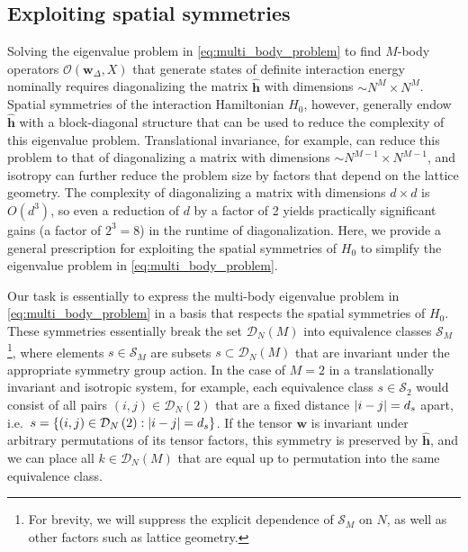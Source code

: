 \documentclass[nofootinbib,notitlepage,11pt]{revtex4-2}
\newcommand{\p}[1]{\left(#1\right)} %
\renewcommand{\set}[1]{\left\{#1\right\}} %
\newcommand{\m}{\bm} %
\newcommand{\1}{\mathds{1}}
\newcommand{\D}{\mathcal{D}}
\renewcommand{\O}{\mathcal{O}}
\renewcommand{\S}{\mathcal{S}}
\begin{document}
\subsection{Exploiting spatial symmetries}
\label{sec:symmetries}

Solving the eigenvalue problem in \eqref{eq:multi_body_problem} to find $M$-body operators $\O\p{\m w_\Delta,X}$ that generate states of definite interaction energy nominally requires diagonalizing the matrix $\hat{\m h}$ with dimensions $\sim N^M\times N^M$.
Spatial symmetries of the interaction Hamiltonian $H_0$, however, generally endow $\hat{\m h}$ with a block-diagonal structure that can be used to reduce the complexity of this eigenvalue problem.
Translational invariance, for example, can reduce this problem to that of diagonalizing a matrix with dimensions $\sim N^{M-1}\times N^{M-1}$, and isotropy can further reduce the problem size by factors that depend on the lattice geometry.
The complexity of diagonalizing a matrix with dimensions $d\times d$ is $O\p{d^3}$, so even a reduction of $d$ by a factor of 2 yields practically significant gains (a factor of $2^3=8$) in the runtime of diagonalization.
Here, we provide a general prescription for exploiting the spatial symmetries of $H_0$ to simplify the eigenvalue problem in \eqref{eq:multi_body_problem}.

Our task is essentially to express the multi-body eigenvalue problem in \eqref{eq:multi_body_problem} in a basis that respects the spatial symmetries of $H_0$.
These symmetries essentially break the set $\D_N\p{M}$ into equivalence classes $\S_M$\footnote{For brevity, we will suppress the explicit dependence of $\S_M$ on $N$, as well as other factors such as lattice geometry.}, where elements $s\in\S_M$ are subsets $s\subset\D_N\p{M}$ that are invariant under the appropriate symmetry group action.
In the case of $M=2$ in a translationally invariant and isotropic system, for example, each equivalence class $s\in\S_2$ would consist of all pairs $\p{i,j}\in\D_N\p{2}$ that are a fixed distance $\abs{i-j}=d_s$ apart, i.e.~$s=\set{\p{i,j}\in\D_N\p{2}:\abs{i-j}=d_s}$.
If the tensor $\m w$ is invariant under arbitrary permutations of its tensor factors, this symmetry is preserved by $\hat{\m h}$, and we can place all $k\in\D_N\p{M}$ that are equal up to permutation into the same equivalence class.
\end{document}
